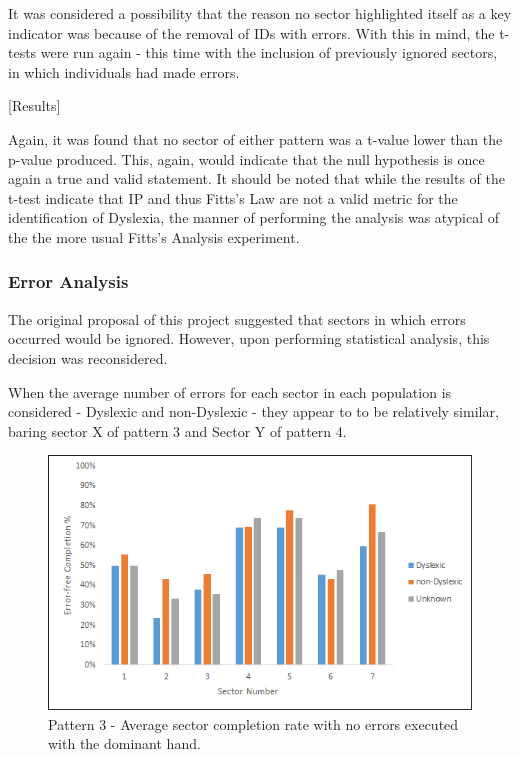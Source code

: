 		It was considered a possibility that the reason no sector highlighted itself as a key indicator was because of the removal of IDs with errors. With this in mind, the t-tests were run again - this time with the inclusion of previously ignored sectors, in which individuals had made errors.

		[Results]

		Again, it was found that no sector of either pattern was a t-value lower than the p-value produced. This, again, would indicate that the null hypothesis is once again a true and valid statement.
		It should be noted that while the results of the t-test indicate that IP and thus Fitts’s Law are not a valid metric for the identification of Dyslexia, the manner of performing the analysis was atypical of the the more usual Fitts’s Analysis experiment.

	\subsubsection{Error Analysis}
		The original proposal of this project suggested that sectors in which errors occurred would be ignored. However, upon performing statistical analysis, this decision was reconsidered.
		
		When the average number of errors for each sector in each population is considered - Dyslexic and non-Dyslexic - they appear to to be relatively similar, baring sector X of pattern 3 and Sector Y of pattern 4.
		
		
		\begin{figure}[h]
			\centering
			\includegraphics[width = \textwidth]{../images/pat_3_com_dom}
			\caption{Pattern 3 - Average sector completion rate with no errors executed with the dominant hand.}
			\label{fig_pat_3_com_dom}
		\end{figure}		
		
